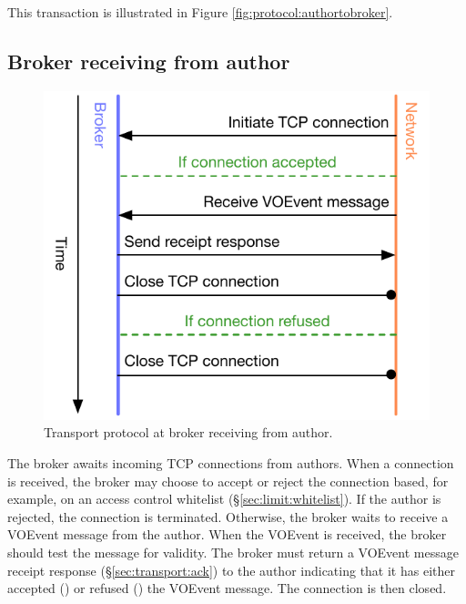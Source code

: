 \documentclass[a4paper,11pt]{ivoa}
\begin{document}
This transaction is illustrated in Figure \ref{fig:protocol:authortobroker}.

\subsection{Broker receiving from author}
\label{sec:protocol:brokerfromauthor}

\begin{figure}
  \begin{center}
  \includegraphics{figures/brokerfromauthor.pdf}
  \end{center}

  \caption{Transport protocol at broker receiving from author.}

  \label{fig:protocol:brokerfromauthor}
\end{figure}

The broker awaits incoming TCP connections from authors. When a connection is
received, the broker may choose to accept or reject the connection based, for
example, on an access control whitelist (\S\ref{sec:limit:whitelist}). If the
author is rejected, the connection is terminated. Otherwise, the broker waits
to receive a VOEvent message from the author. When the VOEvent is received,
the broker should test the message for validity. The broker must return a
VOEvent message receipt response (\S\ref{sec:transport:ack}) to the author
indicating that it has either accepted () or refused ()
the VOEvent message. The connection is then closed.
\end{document}
